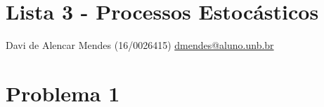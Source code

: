 \documentclass{article}
\begin{document}
\setlength{\abovedisplayskip}{12pt}
\setlength{\belowdisplayskip}{0.75em}
\setlength{\abovedisplayshortskip}{0pt}
\setlength{\belowdisplayshortskip}{0pt}
\setlength{\jot}{1pt}

\section*{Lista 3 - Processos Estocásticos}
Davi de Alencar Mendes (16/0026415) \url{dmendes@aluno.unb.br}
\section*{Problema 1}

\end{document}
